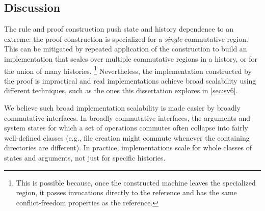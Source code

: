 \begin{comment}
\caption{\textbf{(a)} A serial, single-threaded history. Each invocation (filled
  circle) is immediately followed by its response (open circle).
%
  \textbf{(b)} A three-thread history. Colors indicate different threads.
%
  \textbf{(c)} The thread-restricted subhistories of (b). Each is
  serial.
%
  \textbf{(d)} A three-thread history with a commutative region. The
  commutative region is highlighted.
%
  \textbf{(e)} Three interleavings of the commutative region.
%
  \protect\XXX[E]{This figure is currently unreferenced, leaving it in case
  others think it useful.}~
}
\end{figure*}
\end{comment}

\subsection{Discussion}

The rule and proof construction push state and
history dependence to an extreme: the proof construction is specialized
for a \emph{single} commutative region.
%
This can be mitigated by repeated application of the construction to
build an
implementation that scales over multiple commutative regions in a
history, or for the union of many histories.%
%
\footnote{This is possible because, once the constructed machine
  leaves the specialized region, it passes invocations directly to the
  reference and has the same conflict-freedom properties as the
  reference.}
%
Nevertheless, the implementation constructed by the proof is
impractical and real implementations achieve broad scalability using
different techniques, such as the ones this dissertation explores in
\cref{sec:sv6}.

We believe such broad implementation scalability is made easier by
broadly commutative interfaces.
%
In broadly commutative interfaces, the arguments and system states for
which a set of operations
commutes often collapse into
fairly well-defined classes (e.g., file creation might
commute whenever the containing directories are different).
%
In practice, implementations scale for whole classes of states and
arguments, not just for specific histories.


